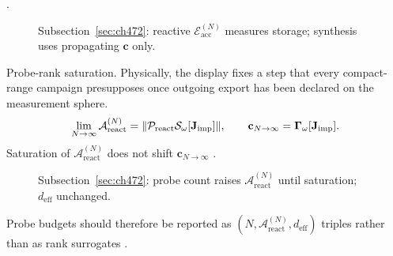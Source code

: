\cite{harrington2001}.
\begin{figure}[t]
\centering
{}
\caption{Subsection~\ref{sec:ch472}: reactive $\mathcal{E}_{\mathrm{acc}}^{(N)}$ measures storage; synthesis uses propagating \(\mathbf{c}\) only.}
\label{fig:ch4.reactive-accessibility-split}
\end{figure}
Probe-rank saturation. Physically, the display fixes a step that every compact-range campaign presupposes once outgoing export has been declared on the measurement sphere. \cite{stratton1941}
\begin{equation}
\label{eq:ch4.probe-saturation}
\lim_{N\to\infty}\mathcal{A}_{\mathrm{react}}^{(N)}=\|\mathcal{P}_{\mathrm{react}}\mathcal{S}_\omega[\mathbf{J}_{\mathrm{imp}}]\|,\qquad
\mathbf{c}_{N\to\infty}=\boldsymbol{\Gamma}_\omega[\mathbf{J}_{\mathrm{imp}}].
\end{equation}
Saturation of \(\mathcal{A}_{\mathrm{react}}^{(N)}\) does not shift \(\mathbf{c}_{N\to\infty}\) \cite{stratton1941}.
\begin{figure}[t]
\centering
{}
\caption{Subsection~\ref{sec:ch472}: probe count raises \(\mathcal{A}_{\mathrm{react}}^{(N)}\) until saturation; \(d_{\mathrm{eff}}\) unchanged.}
\label{fig:ch4.probe-saturation-map}
\end{figure}
Probe budgets should therefore be reported as \((N,\mathcal{A}_{\mathrm{react}}^{(N)},d_{\mathrm{eff}})\) triples rather than as rank surrogates
\cite{hansen1988}.
\label{cor:ch4.prop-filter-persist}
